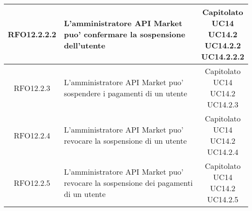 \begin{longtable}{|c|p{8cm}|c|}
\hypertarget{RFO12.2.2.2}{RFO12.2.2.2} &  L'amministratore API Market puo' confermare la sospensione dell'utente& \makecell*{Capitolato\\UC14\\UC14.2\\UC14.2.2\\UC14.2.2.2} \\
\hline

\hypertarget{RFO12.2.3}{RFO12.2.3} &  L'amministratore API Market puo' sospendere i pagamenti di un utente& \makecell*{Capitolato\\UC14\\UC14.2\\UC14.2.3} \\
\hline

\hypertarget{RFO12.2.4}{RFO12.2.4} &  L'amministratore API Market puo' revocare la sospensione di un utente& \makecell*{Capitolato\\UC14\\UC14.2\\UC14.2.4} \\
\hline

\hypertarget{RFO12.2.5}{RFO12.2.5} &  L'amministratore API Market puo' revocare la sospensione dei pagamenti di un utente& \makecell*{Capitolato\\UC14\\UC14.2\\UC14.2.5} \\
\hline


\end{longtable}

